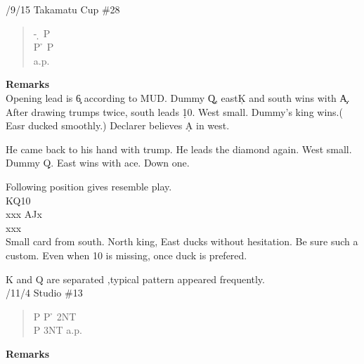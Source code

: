 /9/15 Takamatu Cup \#28
\begin{quote}
%
  {}%
  {}%
  {}
  {}%
\end{quote}
\begin{quote}
\begin{bidding}
- \d  \> P \h \\
P \h \> P \h\\
a.p.
\end{bidding}
\end{quote}
{\bf Remarks}\\

Opening lead is \c 6 according to MUD. Dummy \c Q, east\c K and
south wins with \c A. After drawing trumps twice, south leads \d 10.
West small. Dummy's king wins.( Easr ducked smoothly.) Declarer
believes \d A in west.

He came back to his hand with trump. He leads the diamond again.
West small. Dummy \d Q. East wins with ace. Down one.

Following position gives resemble play.\\
\qquad \qquad KQ10\\
\qquad xxx \qquad AJx \\
\qquad \qquad xxx\\
Small card from south. North king, East ducks without hesitation.
Be sure such a custom. Even when 10 is missing, once duck is prefered.


\vspace {0.5cm}
K and Q are separated ,typical pattern appeared frequently.\\

/11/4 Studio \#13
\begin{quote}
%
  {}%
  {}
  {}%
  {}%
\end{quote}
\begin{quote}
\begin{bidding}
P \> P  \h  \> 2NT\\
P \>  3NT \> a.p.
\end{bidding}
\end{quote}
{\bf Remarks}\\


